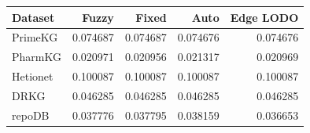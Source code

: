 \begin{tabular}{lrrrr}
\hline
Dataset & Fuzzy & Fixed & Auto & Edge LODO \\
\hline
PrimeKG & 0.074687 & 0.074687 & 0.074676 & 0.074676 \\
PharmKG & 0.020971 & 0.020956 & 0.021317 & 0.020969 \\
Hetionet & 0.100087 & 0.100087 & 0.100087 & 0.100087 \\
DRKG & 0.046285 & 0.046285 & 0.046285 & 0.046285 \\
repoDB & 0.037776 & 0.037795 & 0.038159 & 0.036653 \\
\hline
\end{tabular}
